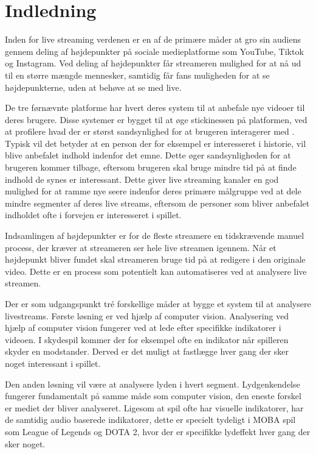 \documentclass{article}
\begin{document}
\renewcommand{\contentsname}{Indholdsfortegnelse}

\tableofcontents

\section{Indledning}
Inden for live streaming verdenen er en af de primære måder at gro sin audiens gennem deling af højdepunkter på sociale medieplatforme som YouTube, Tiktok og Instagram. Ved deling af højdepunkter får streameren mulighed for at nå ud til en større mængde mennesker, samtidig får fans muligheden for at se højdepunkterne, uden at behøve at se med live.

De tre førnævnte platforme har hvert deres system til at anbefale nye videoer til deres brugere. Disse systemer er bygget til at øge stickinessen på platformen, ved at profilere hvad der er størst sandsynlighed for at brugeren interagerer med \cite{meserole_how_2022}.
Typisk vil det betyder at en person der for eksempel er interesseret i historie, vil blive anbefalet indhold indenfor det emne. Dette øger sandsynligheden for at brugeren kommer tilbage, eftersom brugeren skal bruge mindre tid på at finde indhold de synes er interessant. Dette giver live streaming kanaler en god mulighed for at ramme nye seere indenfor deres primære målgruppe ved at dele mindre segmenter af deres live streams, eftersom de personer som bliver anbefalet indholdet ofte i forvejen er interesseret i spillet.

Indsamlingen af højdepunkter er for de fleste streamere en tidskrævende manuel process, der kræver at streameren ser hele live streamen igennem. Når et højdepunkt bliver fundet skal streameren bruge tid på at redigere i den originale video. Dette er en process som potentielt kan automatiseres ved at analysere live streamen.

Der er som udgangspunkt tré forskellige måder at bygge et system til at analysere livestreams. Første løsning er ved hjælp af computer vision. Analysering ved hjælp af computer vision fungerer ved at lede efter specifikke indikatorer i videoen. I skydespil kommer der for eksempel ofte en indikator når spilleren skyder en modstander. Derved er det muligt at fastlægge hver gang der sker noget interessant i spillet.

Den anden løsning vil være at analysere lyden i hvert segment. Lydgenkendelse fungerer fundamentalt på samme måde som computer vision, den eneste forskel er mediet der bliver analyseret. Ligesom at spil ofte har visuelle indikatorer, har de samtidig audio baserede indikatorer, dette er specielt tydeligt i MOBA spil som League of Legends og DOTA 2, hvor der er specifikke lydeffekt hver gang der sker noget.
\end{document}
